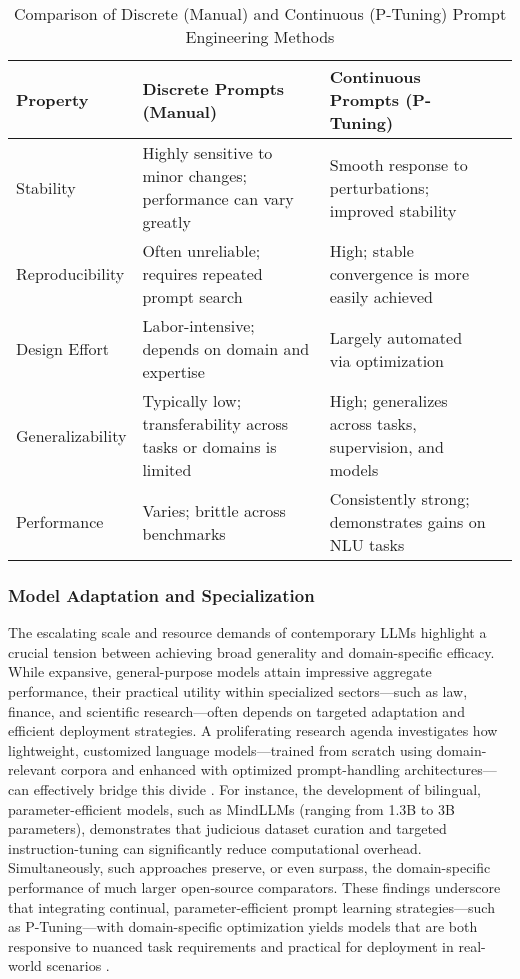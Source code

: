 \documentclass[sigconf]{acmart}
\begin{document}
\begin{table*}[htbp]
\centering
\caption{Comparison of Discrete (Manual) and Continuous (P-Tuning) Prompt Engineering Methods}
\label{tab:prompt_comparison}
\begin{adjustbox}{max width=\textwidth}
\begin{tabular}{@{}llll@{}}
\toprule
\textbf{Property} & \textbf{Discrete Prompts (Manual)} & \textbf{Continuous Prompts (P-Tuning)} & \\
\midrule
Stability & Highly sensitive to minor changes; performance can vary greatly & Smooth response to perturbations; improved stability & \\
Reproducibility & Often unreliable; requires repeated prompt search & High; stable convergence is more easily achieved & \\
Design Effort & Labor-intensive; depends on domain and expertise & Largely automated via optimization & \\
Generalizability & Typically low; transferability across tasks or domains is limited & High; generalizes across tasks, supervision, and models & \\
Performance & Varies; brittle across benchmarks & Consistently strong; demonstrates gains on NLU tasks & \\
\bottomrule
\end{tabular}
\end{adjustbox}
\end{table*}

\subsubsection{Model Adaptation and Specialization}

The escalating scale and resource demands of contemporary LLMs highlight a crucial tension between achieving broad generality and domain-specific efficacy. While expansive, general-purpose models attain impressive aggregate performance, their practical utility within specialized sectors---such as law, finance, and scientific research---often depends on targeted adaptation and efficient deployment strategies. A proliferating research agenda investigates how lightweight, customized language models---trained from scratch using domain-relevant corpora and enhanced with optimized prompt-handling architectures---can effectively bridge this divide \cite{ref104}. For instance, the development of bilingual, parameter-efficient models, such as MindLLMs (ranging from 1.3B to 3B parameters), demonstrates that judicious dataset curation and targeted instruction-tuning can significantly reduce computational overhead. Simultaneously, such approaches preserve, or even surpass, the domain-specific performance of much larger open-source comparators. These findings underscore that integrating continual, parameter-efficient prompt learning strategies---such as P-Tuning---with domain-specific optimization yields models that are both responsive to nuanced task requirements and practical for deployment in real-world scenarios \cite{ref103}\cite{ref104}.
\end{document}
